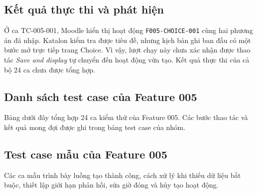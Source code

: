 \subsection{Kết quả thực thi và phát hiện}\label{sec:f005-result}
Ở ca TC-005-001, Moodle hiển thị hoạt động \texttt{F005-CHOICE-001} cùng hai phương án đã nhập. Katalon kiểm tra được tiêu đề, nhưng kịch bản ghi ban đầu có một bước mở trực tiếp trang Choice. Vì vậy, lượt chạy này chưa xác nhận được thao tác \textit{Save and display} tự chuyển đến hoạt động vừa tạo. Kết quả thực thi của cả bộ 24 ca chưa được tổng hợp.

\subsection{Danh sách test case của Feature 005}
Bảng dưới đây tổng hợp 24 ca kiểm thử của Feature 005. Các bước thao tác và kết quả mong đợi được ghi trong bảng test case của nhóm.


\subsection{Test case mẫu của Feature 005}
Các ca mẫu trình bày luồng tạo thành công, cách xử lý khi thiếu dữ liệu bắt buộc, thiết lập giới hạn phản hồi, sửa giờ đóng và hủy tạo hoạt động.

